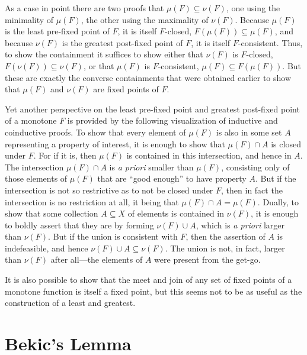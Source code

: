 \documentclass[11pt,twoside]{article}
\begin{document}
As a case in point there are two proofs that $\mu(F)\subseteq\nu(F)$, one using the minimality of
$\mu(F)$, the other using the maximality of $\nu(F)$.  Because $\mu(F)$ is the least pre-fixed
point of $F$, it is itself $F$-closed, $F(\mu(F))\subseteq\mu(F)$, and because $\nu(F)$ is the greatest
post-fixed point of $F$, it is itself $F$-consistent.  Thus, to show the containment it
suffices to show either that $\nu(F)$ is $F$-closed, $F(\nu(F))\subseteq\nu(F)$, or that
$\mu(F)$ is $F$-consistent, $\mu(F)\subseteq F(\mu(F))$.  But these are exactly the converse
containments that were obtained earlier to show that $\mu(F)$ and $\nu(F)$ are fixed points of
$F$.

\smallskip

Yet another perspective on the least pre-fixed point and greatest post-fixed point of a
monotone $F$ is provided by the following visualization of inductive and coinductive
proofs.  To show that every element of $\mu(F)$ is also in some set $A$ representing a
property of interest, it is enough to show that $\mu(F)\cap A$ is closed under $F$.  For if it
is, then $\mu(F)$ is contained in this intersection, and hence in $A$.  The intersection
$\mu(F)\cap A$ is \emph{a priori} smaller than $\mu(F)$, consisting only of those elements of
$\mu(F)$ that are ``good enough'' to have property $A$.  But if the intersection is not so
restrictive as to not be closed under $F$, then in fact the intersection is no restriction
at all, it being that $\mu(F)\cap A=\mu(F)$.  Dually, to show that some collection
$A\subseteq X$ of elements is contained in $\nu(F)$, it is enough to boldly assert that they are by
forming $\nu(F)\cup A$, which is \emph{a priori} larger than $\nu(F)$.  But if the union is
consistent with $F$, then the assertion of $A$ is indefeasible, and hence
$\nu(F)\cup A\subseteq\nu(F)$.  The union is not, in fact, larger than $\nu(F)$ after all---the elements of
$A$ were present from the get-go.

\smallskip

It is also possible to show that the meet and join of any set of fixed points of a
monotone function is itself a fixed point, but this seems not to be as useful as the
construction of a least and greatest.

\section{Bekic's Lemma}
\end{document}
